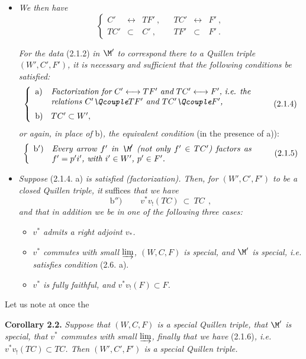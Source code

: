 \begin{itemize}
\item[1°)] \textit{We then have}
\[
\left\{
\begin{array}{rclcrcl}
C' & \longleftrightarrow & TF'\ , & & TC' & \longleftrightarrow & F'\ ,\\
TC' & \subset & C'\ , & & TF' & \subset & F'\ .
\end{array}\right.
\tag*{(2.1.3)}
\]

\textit{For the data} (2.1.2) \textit{in $\M'$ to correspond there to a Quillen triple $(W',C',F')$, it is necessary and sufficient that the following conditions be satisfied:}
\[
\left\{
\begin{array}{ll}
\text{a)} & \parbox[t]{0.7\textwidth}{\textit{Factorization for $C' \longleftrightarrow TF'$ and $TC' \longleftrightarrow F'$, i.e. the relations $C' \Qcouple TF'$ and $TC' \Qcouple F'$,}}\\[4ex]
\text{b)} & TC' \subset W',
\end{array}\right. %
\tag*{(2.1.4)}
\]
\textit{or again, in place of} b)\textit{, the equivalent condition} (in the presence of a)):
\[
\left\{
\begin{array}{ll}
\text{b$'$)} & \parbox[t]{0.7\textwidth}{\textit{Every arrow $f'$ in $\M'$ (not only $f' \in TC'$) factors as $f' = p'i'$, with $i' \in W'$, $p' \in F'$.}}
\end{array}\right.
\tag*{(2.1.5)}
\]
\item[2°)] \textit{Suppose} (2.1.4. a) \textit{is satisfied (factorization). Then, for $(W',C',F')$ to be a closed Quillen triple, it} suffices \textit{that we have}
\[
\text{b$''$)}\qquad \boxed{\ v^*v_!(TC)\ \subset\ TC\ }\ ,
\tag*{(2.1.6)}
\]
\textit{and that in addition we be in one of the following three cases:}
\begin{itemize}
\item[A)] \textit{$v^*$ admits a right adjoint $v_*$.}
\item[B)] \textit{$v^*$ commutes with small} $\varinjlim$\textit{, $(W,C,F)$ is special, and $\M'$ is special, i.e. satisfies condition} (2.6. a).
\item[C)] \textit{$v^*$ is fully faithful, and $v^*v_!(F) \subset F$.}
\end{itemize}
\end{itemize}
Let us note at once the

\textbf{Corollary 2.2.} \textit{Suppose that $(W,C,F)$ is a special Quillen triple, that $\M'$ is special, that $v^*$ commutes with small} $\varinjlim$\textit{, finally that we have} (2.1.6)\textit{, i.e. $v^*v_!(TC) \subset TC$. Then $(W',C',F')$ is a special Quillen triple.}

